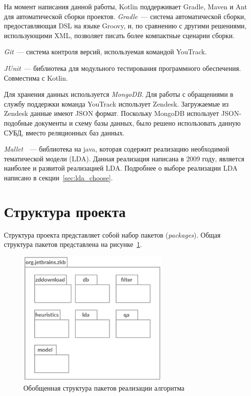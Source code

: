 На момент написания данной работы, Kotlin поддерживает Gradle, Maven и Ant для автоматической сборки проектов. \textit{Gradle}~--- система автоматической сборки, предоставляющая DSL на языке Groovy, и, по сравнению с другими решениями, использующими XML, позволяет писать более компактные сценарии сборки.


\textit{Git}~--- система контроля версий, используемая командой YouTrack.

\textit{JUnit}~--- библиотека для модульного тестирования программного обеспечения. Совместима с Kotlin.

Для хранения данных используется \textit{MongoDB}. Для работы с обращениями в службу поддержки команда YouTrack использует Zendesk. Загружаемые из Zendesk данные имеют JSON формат. Поскольку MongoDB использует JSON-подобные документы и схему базы данных, было решено использовать данную СУБД, вместо реляционных баз данных.

\textit{Mallet}~\cite{MALLET}~--- библиотека на java, которая содержит реализацию необходимой тематической модели (LDA). Данная реализация написана в 2009 году, является наиболее  и развитой реализацией LDA. Подробнее о выборе реализации LDA написано в секции~\ref{sec:lda_choose}.

\section{Структура проекта}

Структура проекта представляет собой набор пакетов (\textit{packages}). Общая структура пакетов представлена на рисунке~\ref{fig:pckgs}. 

\begin{figure}[tph!]
\centerline{\includegraphics[width=7.5cm]{fig/pckgs.png}}
    \caption{Обобщенная структура пакетов реализации алгоритма}
    \label{fig:pckgs}
\end{figure}

